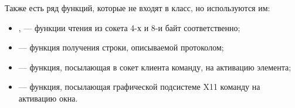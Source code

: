 Также есть ряд функций, которые не входят в класс, но используются им:
\begin{itemize}
    \item {},  — функции чтения из сокета
        4-х и 8-и байт соответственно;
    \item {} — функция получения строки, описываемой протоколом;
    \item {} — функция, посылающая в сокет клиента команду,
        на активацию элемента;
    \item {} — функция, посылающая графической подсистеме
        X11 команду на активацию окна.
\end{itemize}

